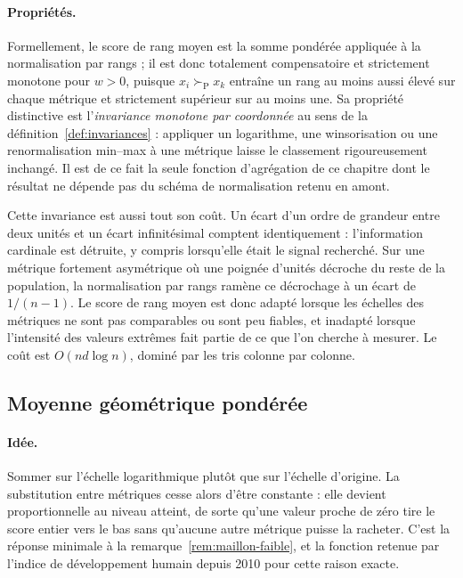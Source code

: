 \documentclass[11pt,a4paper]{article}
\theoremstyle{definition}
\theoremstyle{remark}
\newcommand{\pareto}{\succ_{\mathrm{P}}}
\begin{document}
\paragraph{Propriétés.} Formellement, le score de rang moyen est la somme pondérée
appliquée à la normalisation par rangs ; il est donc totalement compensatoire et
strictement monotone pour $w > 0$, puisque $x_i \pareto x_k$ entraîne un rang au moins
aussi élevé sur chaque métrique et strictement supérieur sur au moins une. Sa propriété
distinctive est l'\emph{invariance monotone par coordonnée} au sens de la
définition~\ref{def:invariances} : appliquer un logarithme, une winsorisation ou une
renormalisation min--max à une métrique laisse le classement rigoureusement inchangé. Il
est de ce fait la seule fonction d'agrégation de ce chapitre dont le résultat ne dépende
pas du schéma de normalisation retenu en amont.

\bigskip

Cette invariance est aussi tout son coût. Un écart d'un ordre de grandeur entre deux
unités et un écart infinitésimal comptent identiquement : l'information cardinale est
détruite, y compris lorsqu'elle était le signal recherché. Sur une métrique fortement
asymétrique où une poignée d'unités décroche du reste de la population, la normalisation
par rangs ramène ce décrochage à un écart de $1/(n-1)$. Le score de rang moyen est donc
adapté lorsque les échelles des métriques ne sont pas comparables ou sont peu fiables, et
inadapté lorsque l'intensité des valeurs extrêmes fait partie de ce que l'on cherche à
mesurer. Le coût est $O(nd\log n)$, dominé par les tris colonne par colonne.

\bigskip

\subsection{Moyenne géométrique pondérée}
\label{sec:geo}

\medskip

\paragraph{Idée.} Sommer sur l'échelle logarithmique plutôt que sur l'échelle d'origine.
La substitution entre métriques cesse alors d'être constante : elle devient proportionnelle
au niveau atteint, de sorte qu'une valeur proche de zéro tire le score entier vers le bas
sans qu'aucune autre métrique puisse la racheter. C'est la réponse minimale à la
remarque~\ref{rem:maillon-faible}, et la fonction retenue par l'indice de développement
humain depuis 2010 pour cette raison exacte.
\end{document}
